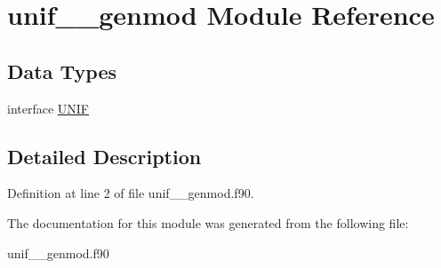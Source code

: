 \hypertarget{classunif____genmod}{\section{unif\+\_\+\+\_\+genmod Module Reference}
\label{classunif____genmod}
}
\subsection*{Data Types}
\begin{DoxyCompactItemize}
\item 
interface \hyperlink{interfaceunif____genmod_1_1_u_n_i_f}{U\+N\+I\+F}
\end{DoxyCompactItemize}


\subsection{Detailed Description}


Definition at line 2 of file unif\+\_\+\+\_\+genmod.\+f90.



The documentation for this module was generated from the following file\+:\begin{DoxyCompactItemize}
\item 
unif\+\_\+\+\_\+genmod.\+f90\end{DoxyCompactItemize}
